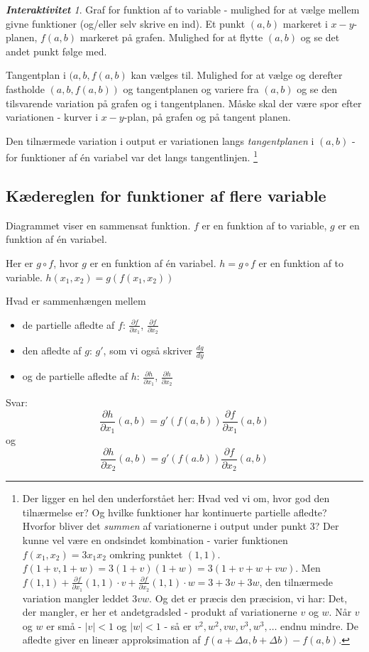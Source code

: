 \documentclass[a4paper, 12pt]{article}
\theoremstyle{remark}
\newtheorem{Interaktiv}{\textbf{Interaktivitet}}
\begin{document}
\begin{Interaktiv} Graf for funktion af to variable - mulighed for at vælge mellem givne funktioner (og/eller selv skrive en ind). Et punkt $(a,b)$ markeret i $x-y$-planen, $f(a,b)$ markeret på grafen. Mulighed for at flytte $(a,b)$ og se det andet punkt følge med.

Tangentplan i $(a,b,f(a,b)$ kan vælges til. Mulighed for at vælge og derefter fastholde $(a,b,f(a,b))$ og tangentplanen og variere fra $(a,b)$ og se den tilsvarende variation på grafen og i tangentplanen. Måske skal der være spor efter variationen - kurver i $x-y$-plan, på grafen og på tangent planen. 
\end{Interaktiv}
Den tilnærmede variation i output er variationen langs \emph{tangentplanen} i $(a,b)$ - for funktioner af én variabel var det langs tangentlinjen. \footnote{Der ligger en hel den underforstået her: Hvad ved vi om, hvor god den tilnærmelse er? Og hvilke funktioner har kontinuerte partielle afledte? Hvorfor bliver det \emph{summen} af variationerne i output under punkt 3? Der kunne vel være en ondsindet kombination - varier funktionen $f(x_1,x_2)=3x_1x_2$ omkring punktet $(1,1)$. $f(1+ v,1+w)=3(1+v)(1+w)=3(1+v+w+vw)$. Men $f(1,1)+\frac{\partial f}{\partial x_1}(1,1)\cdot v +\frac{\partial f}{\partial x_2}(1,1)\cdot w=3+3v+3w$, den tilnærmede variation mangler leddet $3vw$. Og det er præcis den præcision, vi har: Det, der mangler, er her et andetgradsled - produkt af variationerne $v$ og $w$. Når $v$ og $w$ er små - $|v|<1$ og $|w|<1$ -  så er $v^2, w^2, vw, v^3,w^3,\ldots$ endnu mindre. De afledte giver en lineær approksimation af $f(a+\Delta a, b+\Delta b)-f(a,b)$. }

\subsection*{Kædereglen for funktioner af flere variable}
Diagrammet viser en sammensat funktion.  $f$ er en funktion af to variable, $g$ er en funktion af én variabel. 


Her er $g\circ f$, hvor $g$ er en funktion af én variabel. $h=g\circ f$ er en funktion af to variable. $h(x_1,x_2)=g(f(x_1,x_2))$

Hvad er sammenhængen mellem 
\begin{itemize}
\item de partielle afledte af $f$: $\frac{\partial f}{\partial x_1}$,  $\frac{\partial f}{\partial x_2}$
\item den afledte af $g$: $g'$, som vi også skriver $\frac{dg}{dy}$
\item og de partielle afledte af $h$: $\frac{\partial h}{\partial x_1}$,  $\frac{\partial h}{\partial x_2}$
\end{itemize}
Svar: $$\frac{\partial h}{\partial x_1}(a,b)=g'(f(a,b))\frac{\partial f}{\partial x_1}(a,b)$$
og 
$$\frac{\partial h}{\partial x_2}(a,b)=g'(f(a.b))\frac{\partial f}{\partial x_2}(a,b)$$
\end{document}
